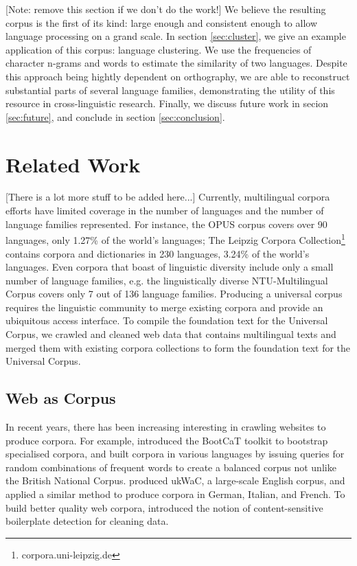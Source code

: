 \documentclass[11pt]{article}
\begin{document}
[Note: remove this section if we don't do the work!] We believe the resulting corpus is the first of its kind: large enough and consistent enough to allow language processing on a grand scale. In section \ref{sec:cluster}, we give an example application of this corpus: language clustering. We use the frequencies of character n-grams and words to estimate the similarity of two languages. Despite this approach being hightly dependent on orthography, we are able to reconstruct substantial parts of several language families, demonstrating the utility of this resource in cross-linguistic research. Finally, we discuss future work in secion \ref{sec:future}, and conclude in section \ref{sec:conclusion}.


\section{Related Work} \label{sec:related}

[There is a lot more stuff to be added here...]
Currently, multilingual corpora efforts have limited coverage in the number of languages and the number of language families represented. For instance, the OPUS corpus \cite{tiedemann2012opus} covers over 90 languages, only 1.27\% of the world's languages; The Leipzig Corpora Collection\footnote{corpora.uni-leipzig.de} \cite{biemann2007leipzig} contains corpora and dictionaries in 230 languages, 3.24\% of the world's languages. Even corpora that boast of linguistic diversity include only a small number of language families, e.g. the linguistically diverse NTU-Multilingual Corpus \cite{tan2011ntu} covers only 7 out of 136 language families. Producing a universal corpus requires the linguistic community to merge existing corpora and provide an ubiquitous access interface. To compile the foundation text for the Universal Corpus, we crawled and cleaned web data that contains multilingual texts and merged them with existing corpora collections to form the foundation text for the Universal Corpus.


\subsection{Web as Corpus}

In recent years, there has been increasing interesting in crawling websites to produce corpora. For example,  introduced the BootCaT toolkit to bootstrap specialised corpora, and  built corpora in various languages by issuing queries for random combinations of frequent words to create a balanced corpus not unlike the British National Corpus.  produced ukWaC, a large-scale English corpus, and \cite{baroni2009wacky} applied a similar method to produce corpora in German, Italian, and French. To build better quality web corpora,  introduced the notion of content-sensitive boilerplate detection for cleaning data.
\end{document}
